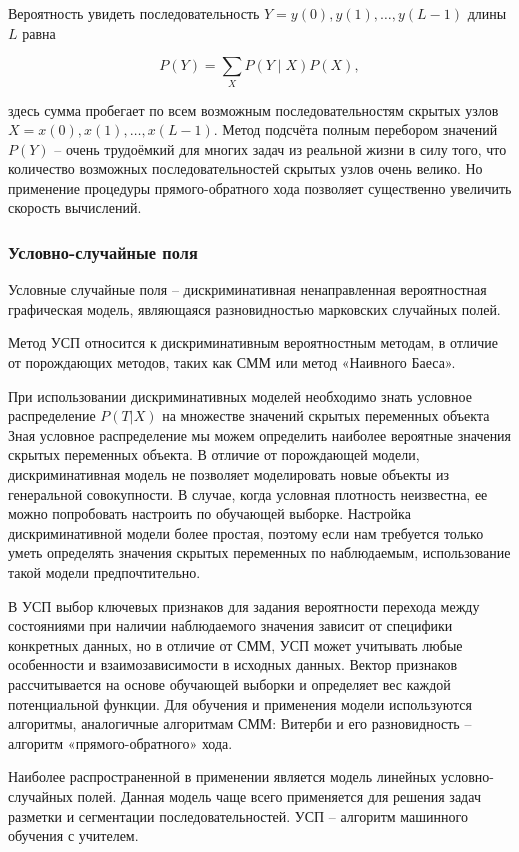 Вероятность увидеть последовательность \( Y=y(0), y(1),\dots,y(L-1) \) длины \( L \) равна

\[ P(Y)=\sum_{X}P(Y\mid X)P(X), \]

здесь сумма пробегает по всем возможным последовательностям скрытых узлов \( X=x(0), x(1), \dots, x(L-1). \) Метод подсчёта полным перебором значений \( P(Y) \) -- очень трудоёмкий для многих задач из реальной жизни в силу того, что количество возможных последовательностей скрытых узлов очень велико. Но применение процедуры прямого-обратного хода позволяет существенно увеличить скорость вычислений.

\subsubsection*{Условно-случайные поля}

Условные случайные поля -- дискриминативная ненаправленная вероятностная графическая модель, являющаяся разновидностью марковских случайных полей.

Метод УСП относится к дискриминативным вероятностным методам, в отличие от порождающих методов, таких как СММ или метод «Наивного Баеса».

При использовании дискриминативных моделей необходимо знать условное распределение \( P(T|X) \) на множестве значений скрытых переменных объекта Зная условное распределение мы можем определить наиболее вероятные значения скрытых переменных объекта. В отличие от порождающей модели, дискриминативная модель не позволяет моделировать новые объекты из генеральной совокупности. В случае, когда условная плотность неизвестна, ее можно попробовать настроить по обучающей выборке. Настройка дискриминативной модели более простая, поэтому если нам требуется только уметь определять значения скрытых переменных по наблюдаемым, использование такой модели предпочтительно.

В УСП выбор ключевых признаков для задания вероятности перехода между состояниями при наличии наблюдаемого значения зависит от специфики конкретных данных, но в отличие от СММ, УСП может учитывать любые особенности и взаимозависимости в исходных данных. Вектор признаков рассчитывается на основе обучающей выборки и определяет вес каждой потенциальной функции. Для обучения и применения модели используются алгоритмы, аналогичные алгоритмам СММ: Витерби и его разновидность – алгоритм «прямого-обратного» хода.

Наиболее распространенной в применении является модель линейных условно-случайных полей. Данная модель чаще всего применяется для решения задач разметки и сегментации последовательностей. УСП -- алгоритм машинного обучения с учителем.

